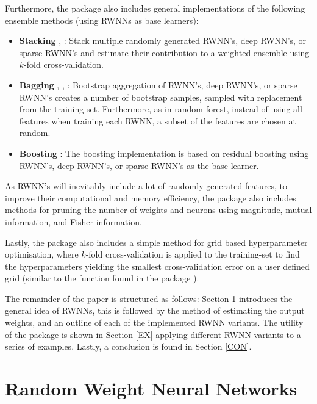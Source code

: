 \documentclass[
]{jss}
\providecommand{\tightlist}{%
  \setlength{\itemsep}{0pt}\setlength{\parskip}{0pt}}
\begin{document}
Furthermore, the  package also includes general
implementations of the following ensemble methods (using RWNNs as base
learners):

\begin{itemize}
\tightlist
\item
  \textbf{Stacking} \citep{Wolpert1992}, \citep{Breiman1996a}: Stack
  multiple randomly generated RWNN's, deep RWNN's, or sparse RWNN's and
  estimate their contribution to a weighted ensemble using \(k\)-fold
  cross-validation.
\item
  \textbf{Bagging} \citep{Breiman1996b}, \citep{Breiman2001},
  \citep{Xin2021}: Bootstrap aggregation of RWNN's, deep RWNN's, or
  sparse RWNN's creates a number of bootstrap samples, sampled with
  replacement from the training-set. Furthermore, as in random forest,
  instead of using all features when training each RWNN, a subset of the
  features are chosen at random.
\item
  \textbf{Boosting} \citep{Friedman2001}: The boosting implementation is
  based on residual boosting using RWNN's, deep RWNN's, or sparse RWNN's
  as the base learner.
\end{itemize}

As RWNN's will inevitably include a lot of randomly generated features,
to improve their computational and memory efficiency, the 
package also includes methods for pruning the number of weights and
neurons using magnitude, mutual information, and Fisher information.

Lastly, the  package also includes a simple method for grid
based hyperparameter optimisation, where \(k\)-fold cross-validation is
applied to the training-set to find the hyperparameters yielding the
smallest cross-validation error on a user defined grid (similar to the
 function found in the package  \citep{e1071}).

The remainder of the paper is structured as follows: Section \ref{RWNN}
introduces the general idea of RWNNs, this is followed by the method of
estimating the output weights, and an outline of each of the implemented
RWNN variants. The utility of the  package is shown in Section
\ref{EX} applying different RWNN variants to a series of examples.
Lastly, a conclusion is found in Section \ref{CON}.

\hypertarget{RWNN}{%
\section{Random Weight Neural Networks}\label{RWNN}}
\end{document}
